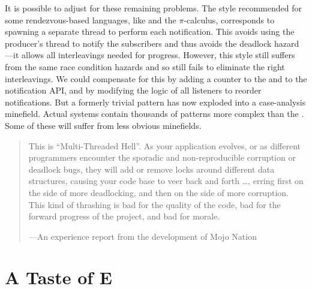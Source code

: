\documentclass{llncs}
\begin{document}
It is possible to adjust for these remaining problems. The style
recommended for some rendezvous-based languages, like  and the $\pi$-calculus, corresponds to spawning a separate thread
to perform each notification.  This avoids using the producer's thread
to notify the subscribers and thus avoids the deadlock
hazard---it allows all interleavings needed for progress. However, this
style still suffers from the same race condition hazards and so still
fails to eliminate the right interleavings. We could compensate for this
by adding a counter to the  and to the notification
API, and by modifying the logic of all listeners to reorder
notifications. But a formerly trivial pattern has now exploded into a
case-analysis minefield. Actual systems contain thousands of patterns
more complex than the . Some of these will suffer
from less obvious minefields.
%
\begin{quotation}
This is ``Multi-Threaded Hell''. As your application evolves, or as
different programmers encounter the sporadic and non-reproducible
corruption or deadlock bugs, they will add or remove locks around
different data structures, causing your code base to veer back and
forth \ldots, erring first on the side of more deadlocking, and then
on the side of more corruption. This kind of thrashing is bad for the
quality of the code, bad for the forward progress of the project, and
bad for morale.
\begin{flushright}
---An experience report from the development of Mojo Nation \cite{zooko:hell}
\end{flushright}
\end{quotation}

\section{A Taste of E}
\end{document}
